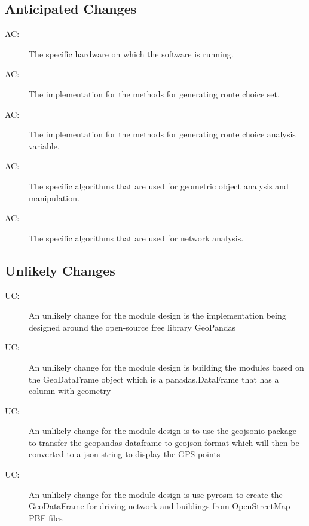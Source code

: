 \documentclass[12pt, titlepage]{article}
\newcounter{acnum}
\newcommand{\actheacnum}{AC\theacnum}
\newcounter{ucnum}
\newcommand{\uctheucnum}{UC\theucnum}
\begin{document}
\subsection{Anticipated Changes} \label{SecAchange}

\begin{description}
\item[ \actheacnum \label{acHardware}:] The specific
  hardware on which the software is running.
\item[ \actheacnum \label{acRCSG}:]  The implementation for the methods for generating route choice set.
\item[ \actheacnum \label{acRCAVG}:]  The implementation for the methods for generating route choice analysis variable.
\item[ \actheacnum \label{acGOAM}:] The specific algorithms that are used for geometric object analysis and manipulation.
\item[ \actheacnum \label{acNA}:] The specific algorithms that are used for network analysis.
\end{description}

\subsection{Unlikely Changes} \label{SecUchange}

\begin{description}
\item[ \uctheucnum \label{ucGPD}:] An unlikely change for the module design is the implementation being designed around the open-source free library GeoPandas
\item [ \uctheucnum \label{ucGDF}:] An unlikely change for the module design is building the modules based on the GeoDataFrame object which is a panadas.DataFrame that has a column with geometry
\item [ \uctheucnum \label{ucP}:] An unlikely change for the module design is to use the geojsonio package to transfer the geopandas dataframe to geojson format which will then be converted to a json string to display the GPS points
\item [ \uctheucnum \label{ucOSMNDR}:] An unlikely change for the module design is use pyrosm to create the GeoDataFrame for driving network and buildings from OpenStreetMap PBF files
\end{description}
\end{document}
